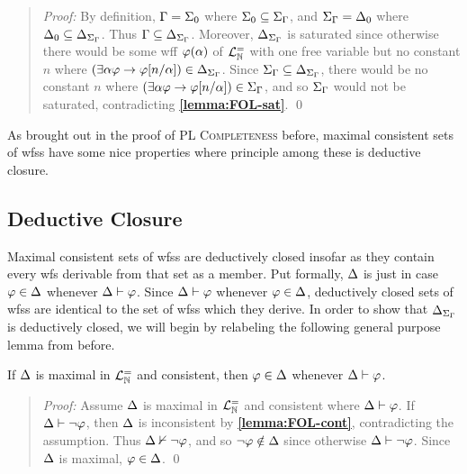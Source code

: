 \begin{quote} 
  \textit{Proof:} 
  By definition, $\Gamma=\Sigma_0$ where $\Sigma_0\subseteq\Sigma_{\Gamma}$, and $\Sigma_{\Gamma}=\Delta_0$ where $\Delta_0\subseteq\Delta_{\Sigma_{\Gamma}}$.
  Thus $\Gamma\subseteq\Delta_{\Sigma_{\Gamma}}$.
  Moreover, $\Delta_{\Sigma_{\Gamma}}$ is saturated since otherwise there would be some wff $\varphi(\alpha)$ of $\mathcal{L}^{=}_{\mathbb{N}}$ with one free variable but no constant $n$ where $(\exists \alpha\varphi \rightarrow \varphi[n/\alpha])\in\Delta_{\Sigma_{\Gamma}}$. 
  Since $\Sigma_{\Gamma}\subseteq\Delta_{\Sigma_{\Gamma}}$, there would be no constant $n$ where $(\exists \alpha\varphi \rightarrow \varphi[n/\alpha])\in\Sigma_{\Gamma}$, and so $\Sigma_{\Gamma}$ would not be saturated, contradicting \textbf{\ref{lemma:FOL-sat}}.
  \qed
\end{quote}

As brought out in the proof of \textsc{PL Completeness} before, maximal consistent sets of wfss have some nice properties where principle among these is deductive closure.



\subsection{Deductive Closure}%
  \label{sub:DeductiveClosure}

Maximal consistent sets of wfss are deductively closed insofar as they contain every wfs derivable from that set as a member.
Put formally, $\Delta$ is  just in case $\varphi\in\Delta$ whenever $\Delta\vdash\varphi$.
Since $\Delta\vdash\varphi$ whenever $\varphi\in\Delta$, deductively closed sets of wfss are identical to the set of wfss which they derive.
In order to show that $\Delta_{\Sigma_{\Gamma}}$ is deductively closed, we will begin by relabeling the following general purpose lemma from before. 


\begin{Lthm} \label{lemma:FOL-deductive}
  If $\Delta$ is maximal in $\mathcal{L}^{=}_{\mathbb{N}}$ and consistent, then $\varphi\in\Delta$ whenever $\Delta\vdash\varphi$.
\end{Lthm}

\begin{quote} 
  \textit{Proof:} Assume $\Delta$ is maximal in $\mathcal{L}^{=}_{\mathbb{N}}$ and consistent where $\Delta\vdash\varphi$.
  If $\Delta\vdash\neg\varphi$, then $\Delta$ is inconsistent by \textbf{\ref{lemma:FOL-cont}}, contradicting the assumption.
  Thus $\Delta\nvdash\neg\varphi$, and so $\neg\varphi\notin\Delta$ since otherwise $\Delta\vdash\neg\varphi$. 
  Since $\Delta$ is maximal, $\varphi\in\Delta$. 
  \qed
\end{quote}



